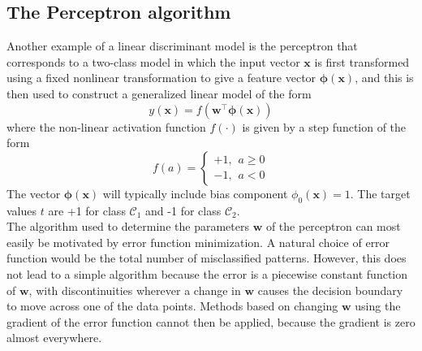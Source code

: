 \documentclass[twoside]{article}
\begin{document}
\subsection{The Perceptron algorithm}
Another example of a linear discriminant model is the perceptron that corresponds to a two-class model in which the input vector $\boldsymbol{x}$ is first transformed using a fixed nonlinear transformation to give a feature vector $\boldsymbol{\phi}(\boldsymbol{x})$, and this is then used to construct a generalized linear model of the form 
\begin{equation}
    y(\boldsymbol{x}) = f(\boldsymbol{w^\intercal}\boldsymbol{\phi}(\boldsymbol{x}))
\end{equation}
where the non-linear activation function $f(\cdot)$ is given by a step function of the form
\begin{equation*}
f(a) =
\begin{cases}
    +1,\hspace{5pt} a \geq 0\\
    -1,\hspace{5pt} a < 0
\end{cases}
\end{equation*}
The vector $\boldsymbol{\phi}(\boldsymbol{x})$ will typically include bias component $\phi_0(\boldsymbol{x}) = 1$. The target values $t$ are +1 for class $\mathcal{C}_1$ and -1 for class $\mathcal{C}_2$.\\
The algorithm used to determine the parameters $\boldsymbol{w}$ of the perceptron can most easily be motivated by error function minimization. A natural choice of error function would be the total number of misclassified patterns. However, this does not lead to a simple algorithm because the error is a piecewise constant function of $\boldsymbol{w}$, with discontinuities wherever a change in $\boldsymbol{w}$ causes the decision boundary to move across one of the data points. Methods based on changing $\boldsymbol{w}$ using the gradient of the error function cannot then be applied, because the gradient is zero almost everywhere.\medskip
\end{document}
